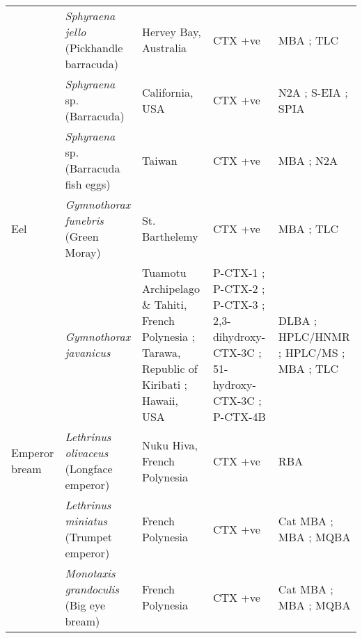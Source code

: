 \documentclass[12pt]{article}
\begin{document}
\begin{longtable}{  | p{2cm} | p{3cm} | p{4.5cm}  | p{2cm} | p{3cm}  | }
 & \emph{Sphyraena jello}  (Pickhandle barracuda) & Hervey Bay, Australia \cite{lewis1984ciguatoxin} & CTX +ve \cite{lewis1984ciguatoxin} & MBA \cite{lewis1984ciguatoxin}; TLC \cite{lewis1984ciguatoxin} \\
 & \emph{Sphyraena} sp. (Barracuda) & California, USA \cite{hokama1990simplified} & CTX +ve \cite{hokama1990simplified} & N2A \cite{hokama1990simplified}; S-EIA \cite{hokama1990simplified}; SPIA \cite{hokama1990simplified} \\
 & \emph{Sphyraena} sp. (Barracuda fish eggs) & Taiwan \cite{hung2005persistent} & CTX +ve \cite{hung2005persistent} & MBA \cite{hung2005persistent}; N2A \cite{hung2005persistent} \\
 \hline
 Eel &  \emph{Gymnothorax funebris} (Green Moray) & St. Barthelemy \cite{vernoux1986heterogeneity}  & CTX +ve \cite{vernoux1986heterogeneity}  & MBA \cite{vernoux1986heterogeneity}; TLC \cite{vernoux1986heterogeneity} \\
  &  \emph{Gymnothorax javanicus} & Tuamotu Archipelago \& Tahiti, French Polynesia \cite{labrousse1996toxicological,murata1990structures,legrand1997two}; Tarawa, Republic of Kiribati \cite{lewis1997characterization}; Hawaii, USA \cite{scheuer1967ciguatoxin} & P-CTX-1 \cite{murata1990structures,lewis1991purification,lewis1997characterization}; P-CTX-2 \cite{lewis1991purification}; P-CTX-3 \cite{lewis1991purification,lewis1997characterization}; 2,3-dihydroxy-CTX-3C \cite{satake1998isolation}; 51-hydroxy-CTX-3C \cite{satake1998isolation}; P-CTX-4B \cite{murata1990structures,lewis1991purification} & DLBA \cite{labrousse1996toxicological}; HPLC/HNMR \cite{murata1990structures,lewis1991purification}; HPLC/MS \cite{lewis1997characterization,satake1998isolation}; MBA \cite{lewis1997characterization,scheuer1967ciguatoxin,satake1998isolation}; TLC \cite{scheuer1967ciguatoxin} \\
  \hline
 Emperor bream & \emph{Lethrinus olivaceus} (Longface emperor) &  Nuku Hiva, French Polynesia \cite{darius2007ciguatera} & CTX +ve \cite{darius2007ciguatera} & RBA \cite{darius2007ciguatera} \\
  & \emph{Lethrinus miniatus} (Trumpet emperor) & French Polynesia \cite{bagnis1987use} & CTX +ve \cite{bagnis1987use} & Cat MBA \cite{bagnis1987use}; MBA \cite{bagnis1987use}; MQBA \cite{bagnis1987use} \\
  &  \emph{Monotaxis grandoculis} (Big eye bream) & French Polynesia \cite{bagnis1987use} & CTX +ve \cite{bagnis1987use}  & Cat MBA \cite{bagnis1987use}; MBA \cite{bagnis1987use}; MQBA \cite{bagnis1987use} \\

\end{longtable}
\end{document}
